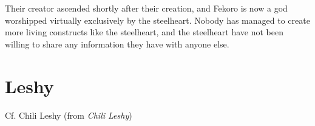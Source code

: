\documentclass{report}
\begin{document}
Their creator ascended shortly after their creation, and Fekoro is now a god
worshipped virtually exclusively by the steelheart. Nobody has managed to create
more living constructs like the steelheart, and the steelheart have not been
willing to share any information they have with anyone else.

\section{Leshy}

Cf. Chili Leshy (from \emph{Chili Leshy})
\end{document}

